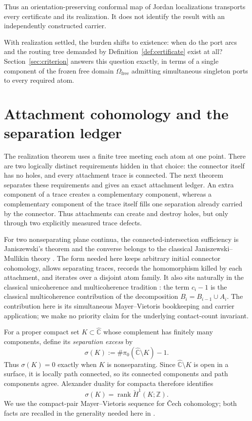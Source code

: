 \documentclass[11pt,reqno]{amsart}
\theoremstyle{definition}
\theoremstyle{remark}
\newcommand{\Z}{\mathbb Z}
\newcommand{\Chat}{\widehat{\mathbb C}}
\newcommand{\Omfree}{\Omega_{\mathrm{free}}}
\begin{document}
Thus an orientation-preserving conformal map of Jordan localizations
transports every certificate and its realization.  It does not identify
the result with an independently constructed carrier.

With realization settled, the burden shifts to existence: when do the
port arcs and the routing tree demanded by
Definition~\ref{def:certificate} exist at all?
Section~\ref{sec:criterion} answers this question exactly, in terms of a
single component of the frozen free domain $\Omfree$ admitting
simultaneous singleton ports to every required atom.

\section{Attachment cohomology and the separation ledger}
\label{sec:separation-budget}

The realization theorem uses a finite tree meeting each atom at one point.
There are two logically distinct requirements hidden in that choice: the
connector itself has no holes, and every attachment trace is connected.  The
next theorem separates these requirements and gives an exact attachment
ledger.  An extra component of a trace creates a complementary component,
whereas a complementary component of the trace itself fills one separation
already carried by the connector.  Thus attachments can create and destroy
holes, but only through two explicitly measured trace defects.

For two nonseparating plane continua, the connected-intersection
sufficiency is Janiszewski's theorem and the converse belongs to the
classical Janiszewski--Mullikin theory \cite{Jan15,Mul22,New51,Why42}.  The
form needed here keeps arbitrary initial connector cohomology, allows
separating traces, records the homomorphism killed by each attachment, and
iterates over a disjoint atom family.  It also sits naturally in the
classical unicoherence and multicoherence tradition \cite{Bor31,Eil36}:
the term $c_i-1$ is the classical multicoherence contribution of the
decomposition $B_i=B_{i-1}\cup A_i$.  The contribution here is its
simultaneous Mayer--Vietoris bookkeeping and carrier application; we make
no priority claim for the underlying contact-count invariant.

For a proper compact set $K\subset\Chat$ whose complement has finitely many
components, define its \emph{separation excess} by
\begin{equation}
 \sigma(K):=\#\pi_0(\Chat\setminus K)-1.
 \label{eq:G-separation-excess}
\end{equation}
Thus $\sigma(K)=0$ exactly when $K$ is nonseparating.  Since
$\Chat\setminus K$ is open in a surface, it is locally path connected, so its
connected components and path components agree.  Alexander duality for
compacta therefore identifies
\begin{equation}
 \sigma(K)=\operatorname{rank}\check H^1(K;\Z).
 \label{eq:G-dual-rank}
\end{equation}
We use the compact-pair Mayer--Vietoris sequence for \v{C}ech cohomology; both
facts are recalled in the generality needed here in \cite[Chapter~6]{Spa66}.
\end{document}
